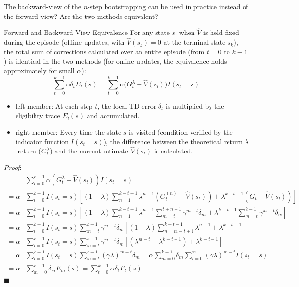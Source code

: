 \documentclass[10pt, a4paper]{report}
\begin{document}
The backward-view of the $n$-step bootstrapping can be used in practice instead of the forward-view? Are the two methods equivalent?
\begin{boxtheorem}{Forward and Backward View Equivalence}{}
    For any state $s$, when $\hat{V}$ is held fixed during the episode (offline updates, with $\hat{V}(s_k)=0$ at the terminal state $s_k$), the total sum of corrections calculated over an entire episode (from $t=0$ to $k-1$) is identical in the two methods (for online updates, the equivalence holds approximately for small $\alpha$): 
    \begin{equation}
    \sum_{t=0}^{k-1} \alpha \delta_t E_t(s) = \sum_{t=0}^{k-1} \alpha \big(G_t^\lambda - \hat V(s_t)\big) I(s_t = s)\end{equation}\begin{itemize}
        \item left member: At each step $t$, the local TD error $\delta_t$ is multiplied by the eligibility trace $E_t(s)$ and accumulated.
        \item right member: Every time the state $s$ is visited (condition verified by the indicator function $I(s_t = s)$), the difference between the theoretical return $\lambda$-return ($G_t^\lambda$) and the current estimate $\hat V(s_t)$ is calculated. 
    \end{itemize}
\end{boxtheorem}
\noindent\textit{Proof}:\begin{align}
&\sum_{t=0}^{k-1} \alpha \left( G_t^\lambda - \hat{V}(s_t) \right) I(s_t = s)\\ 
=\alpha & \sum_{t=0}^{k-1} I(s_t = s) \left[ (1 - \lambda) \sum_{n=1}^{k-t-1} \lambda^{n-1} \left( G_t^{(n)} - \hat{V}(s_t) \right) + \lambda^{k-t-1} \left( G_t - \hat{V}(s_t) \right) \right] \\
=\alpha & \sum_{t=0}^{k-1} I(s_t = s) \left[ (1 - \lambda) \sum_{n=1}^{k-t-1} \lambda^{n-1} \sum_{m=t}^{t+n-1} \gamma^{m-t} \delta_m + \lambda^{k-t-1} \sum_{m=t}^{k-1} \gamma^{m-t} \delta_m \right] \\
=\alpha & \sum_{t=0}^{k-1} I(s_t = s) \sum_{m=t}^{k-1} \gamma^{m-t} \delta_m \left[ (1 - \lambda) \sum_{n=m-t+1}^{k-t-1} \lambda^{n-1} + \lambda^{k-t-1} \right] \\
=\alpha & \sum_{t=0}^{k-1} I(s_t = s) \sum_{m=t}^{k-1} \gamma^{m-t} \delta_m \left[ \left( \lambda^{m-t} - \lambda^{k-t-1} \right) + \lambda^{k-t-1} \right] \\
=\alpha & \sum_{t=0}^{k-1} I(s_t = s) \sum_{m=t}^{k-1} (\gamma \lambda)^{m-t} \delta_m 
= \alpha \sum_{m=0}^{k-1} \delta_m \sum_{t=0}^{m} (\gamma \lambda)^{m-t} I(s_t = s) \\
=\alpha & \sum_{m=0}^{k-1} \delta_m E_m(s) 
= \sum_{t=0}^{k-1} \alpha \delta_t E_t(s)
\end{align}
\hfill$\blacksquare$\bigskip
\end{document}
